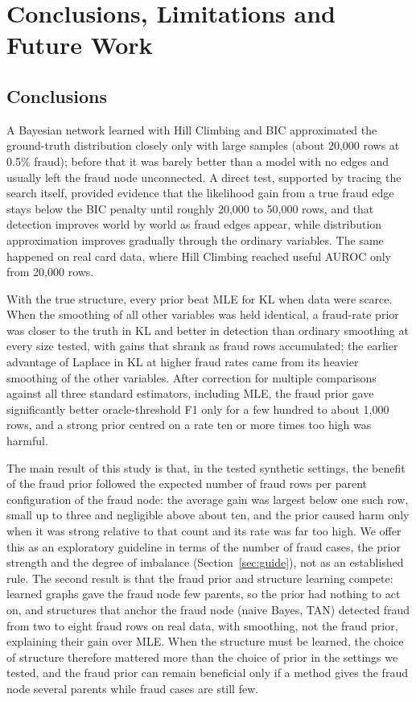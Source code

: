 \documentclass[final,5p,times,authoryear]{elsarticle}
\begin{document}
\section{Conclusions, Limitations and Future Work}
\subsection{Conclusions}
A Bayesian network learned with Hill Climbing and BIC approximated the ground-truth distribution closely only with large samples (about 20,000 rows at 0.5\% fraud); before that it was barely better than a model with no edges and usually left the fraud node unconnected. A direct test, supported by tracing the search itself, provided evidence that the likelihood gain from a true fraud edge stays below the BIC penalty until roughly 20,000 to 50,000 rows, and that detection improves world by world as fraud edges appear, while distribution approximation improves gradually through the ordinary variables. The same happened on real card data, where Hill Climbing reached useful AUROC only from 20,000 rows.

With the true structure, every prior beat MLE for KL when data were scarce. When the smoothing of all other variables was held identical, a fraud-rate prior was closer to the truth in KL and better in detection than ordinary smoothing at every size tested, with gains that shrank as fraud rows accumulated; the earlier advantage of Laplace in KL at higher fraud rates came from its heavier smoothing of the other variables. After correction for multiple comparisons against all three standard estimators, including MLE, the fraud prior gave significantly better oracle-threshold F1 only for a few hundred to about 1,000 rows, and a strong prior centred on a rate ten or more times too high was harmful.

The main result of this study is that, in the tested synthetic settings, the benefit of the fraud prior followed the expected number of fraud rows per parent configuration of the fraud node: the average gain was largest below one such row, small up to three and negligible above about ten, and the prior caused harm only when it was strong relative to that count and its rate was far too high. We offer this as an exploratory guideline in terms of the number of fraud cases, the prior strength and the degree of imbalance (Section~\ref{sec:guide}), not as an established rule. The second result is that the fraud prior and structure learning compete: learned graphs gave the fraud node few parents, so the prior had nothing to act on, and structures that anchor the fraud node (naive Bayes, TAN) detected fraud from two to eight fraud rows on real data, with smoothing, not the fraud prior, explaining their gain over MLE. When the structure must be learned, the choice of structure therefore mattered more than the choice of prior in the settings we tested, and the fraud prior can remain beneficial only if a method gives the fraud node several parents while fraud cases are still few.
\end{document}
